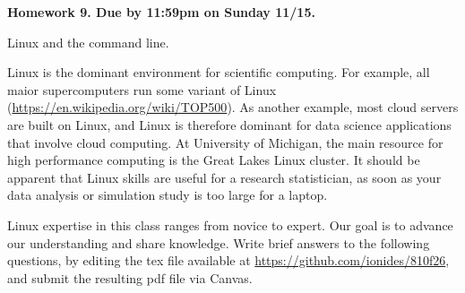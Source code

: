 \documentclass[12pt]{article}
\begin{document}
\begin{center}\bf
Homework 9. Due by 11:59pm on Sunday 11/15.

Linux and the command line.

\end{center}

Linux is the dominant environment for scientific computing. For example, all maior supercomputers run some variant of Linux (\url{https://en.wikipedia.org/wiki/TOP500}). As another example, most cloud servers are built on Linux, and Linux is therefore dominant for data science applications that involve cloud computing. At University of Michigan, the main resource for high performance computing is the Great Lakes Linux cluster. It should be apparent that Linux skills are useful for a research statistician, as soon as your data analysis or simulation study is too large for a laptop.

Linux expertise in this class ranges from novice to expert. Our goal is to advance our understanding and share knowledge. Write brief answers to the following questions, by editing the tex file available at \url{https://github.com/ionides/810f26}, and submit the resulting pdf file via Canvas.
\end{document}
